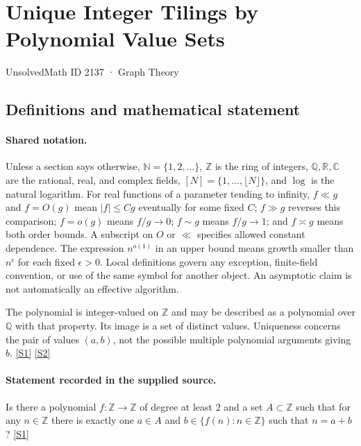 \documentclass[11pt,a4paper]{article}
\newcommand{\N}{\mathbb{N}}
\newcommand{\Z}{\mathbb{Z}}
\newcommand{\Q}{\mathbb{Q}}
\newcommand{\R}{\mathbb{R}}
\newcommand{\C}{\mathbb{C}}
\newcommand{\sref}[2]{\hyperlink{source:#1:#2}{[S#2]}}
\begin{document}

\setcounter{section}{2136}

\section{Unique Integer Tilings by Polynomial Value Sets}\label{2137}

{\small\sffamily UnsolvedMath ID 2137 · Graph Theory}

\subsection{Definitions and mathematical statement}

\paragraph{Shared notation.}Unless a section says otherwise, $\N=\{1,2,\ldots\}$,
$\Z$ is the ring of integers, $\Q,\R,\C$ are the rational, real, and complex
fields, $[N]=\{1,\ldots,\lfloor N\rfloor\}$, and $\log$ is the natural
logarithm. For real functions of a parameter tending to infinity,
$f\ll g$ and $f=O(g)$ mean $|f|\leq Cg$ eventually for some fixed $C$;
$f\gg g$ reverses this comparison; $f=o(g)$ means $f/g\to0$;
$f\sim g$ means $f/g\to1$; and $f\asymp g$ means both order bounds.
A subscript on $O$ or $\ll$ specifies allowed constant dependence.
The expression $n^{o(1)}$ in an upper bound means growth smaller than
$n^\epsilon$ for each fixed $\epsilon>0$. Local definitions govern any
exception, finite-field convention, or use of the same symbol for another
object. An asymptotic claim is not automatically an effective algorithm.



The polynomial is integer-valued on $\Z$ and may be described as a polynomial over $\Q$ with that property. Its image is a set of distinct values. Uniqueness concerns the pair of values $(a,b)$, not the possible multiple polynomial arguments giving $b$. \sref{2137}{1} \sref{2137}{2}

\paragraph{Statement recorded in the supplied source.}
Is there a polynomial $f:\mathbb{Z}\to \mathbb{Z}$ of degree at least $2$ and a set $A\subset \mathbb{Z}$ such that for any $n\in \mathbb{Z}$ there is exactly one $a\in A$ and $b\in \{ f(n) : n\in\mathbb{Z}\}$ such that $n=a+b$? \sref{2137}{1}
\end{document}
